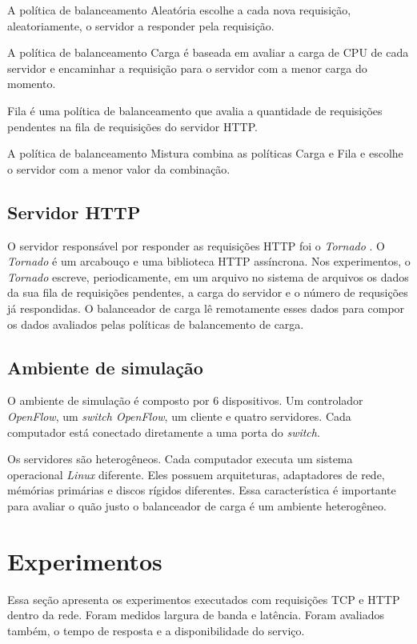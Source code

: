A política de balanceamento Aleatória escolhe a cada nova requisição, 
aleatoriamente, o servidor a responder pela requisição.

A política de balanceamento Carga é baseada em avaliar a carga de CPU 
de cada servidor e encaminhar a requisição para o servidor com a menor 
carga do momento.
    
Fila é uma política de balanceamento que avalia a quantidade de requisições
pendentes na fila de requisições do servidor HTTP.
    
A política de balanceamento Mistura combina as políticas Carga e Fila 
e escolhe o servidor com a menor valor da combinação.

\subsection{Servidor HTTP}

O servidor responsável por responder as requisições HTTP foi o 
\emph{Tornado} \citep{tornado}.
O \emph{Tornado} é um arcabouço e uma biblioteca HTTP assíncrona.
Nos experimentos, o \emph{Tornado} escreve, periodicamente, em um arquivo 
no sistema de arquivos os dados da sua fila de requisições pendentes,
a carga do servidor e o número de requsições já respondidas.
O balanceador de carga lê remotamente esses dados para compor os 
dados avaliados pelas políticas de balancemento de carga.

\subsection{Ambiente de simulação}

O ambiente de simulação é composto por 6 dispositivos.
Um controlador \emph{OpenFlow}, um \emph{switch OpenFlow}, um 
cliente e quatro servidores.
Cada computador está conectado diretamente a uma porta do \emph{switch}.

Os servidores são heterogêneos.
Cada computador executa um sistema operacional \emph{Linux} diferente.
Eles possuem arquiteturas, adaptadores de rede, mémórias primárias
e discos rígidos diferentes.
Essa característica é importante para avaliar o quão justo o balanceador 
de carga é um ambiente heterogêneo.

\section{Experimentos}

Essa seção apresenta os experimentos executados com requisições TCP e HTTP
dentro da rede.
Foram medidos largura de banda e latência.
Foram avaliados também, o tempo de resposta e a disponibilidade do serviço.


